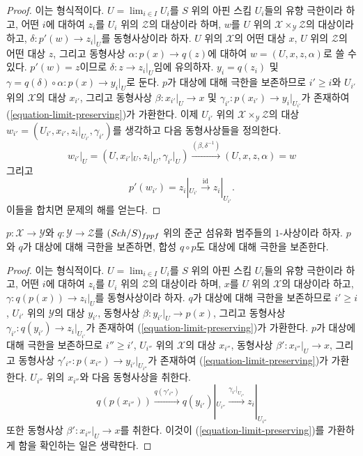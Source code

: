 \begin{proof}
이는 형식적이다. $U = \lim_{i \in I} U_i$를 $S$ 위의 아핀 스킴
$U_i$들의 유향 극한이라 하고, 어떤 $i$에 대하여 $z_i$를
$U_i$ 위의 $\mathcal{Z}$의 대상이라 하며, $w$를 $U$ 위의
$\mathcal{X} \times_\mathcal{Y} \mathcal{Z}$의 대상이라 하고,
$\delta : p'(w) \to z_i|_U$를 동형사상이라 하자.
$U$ 위의 $\mathcal{X}$의 어떤 대상 $x$, $U$ 위의 $\mathcal{Z}$의
어떤 대상 $z$, 그리고 동형사상 $\alpha : p(x) \to q(z)$에 대하여
$w = (U, x, z, \alpha)$로 쓸 수 있다. $p'(w) = z$이므로
$\delta : z \to z_i|_U$임에 유의하자. $y_i = q(z_i)$ 및
$\gamma = q(\delta) \circ \alpha : p(x) \to y_i|_U$로 둔다.
$p$가 대상에 대해 극한을 보존하므로 $i' \geq i$와
$U_{i'}$ 위의 $\mathcal{X}$의 대상 $x_{i'}$, 그리고 동형사상
$\beta : x_{i'}|_U \to x$ 및
$\gamma_{i'} : p(x_{i'}) \to y_i|_{U_{i'}}$가 존재하여
(\ref{equation-limit-preserving})가 가환한다. 이제
$U_{i'}$ 위의 $\mathcal{X} \times_\mathcal{Y} \mathcal{Z}$의 대상
$w_{i'} = (U_{i'}, x_{i'}, z_i|_{U_{i'}}, \gamma_{i'})$를 생각하고
다음 동형사상들을 정의한다.
$$
w_{i'}|_U = (U, x_{i'}|_U, z_i|_U, \gamma_{i'}|_U)
\xrightarrow{(\beta, \delta^{-1})}
(U, x, z, \alpha) = w
$$
그리고
$$
p'(w_{i'}) = z_i|_{U_{i'}} \xrightarrow{\text{id}} z_i|_{U_{i'}}.
$$
이들을 합치면 문제의 해를 얻는다.
\end{proof}

\begin{lemma}
\label{lemma-composition-limit-preserving}
$p : \mathcal{X} \to \mathcal{Y}$와 $q : \mathcal{Y} \to \mathcal{Z}$를
$(\mathit{Sch}/S)_{fppf}$ 위의 준군 섬유화 범주들의 $1$-사상이라 하자.
$p$와 $q$가 대상에 대해 극한을 보존하면, 합성
$q \circ p$도 대상에 대해 극한을 보존한다.
\end{lemma}

\begin{proof}
이는 형식적이다. $U = \lim_{i \in I} U_i$를 $S$ 위의 아핀 스킴
$U_i$들의 유향 극한이라 하고, 어떤 $i$에 대하여 $z_i$를
$U_i$ 위의 $\mathcal{Z}$의 대상이라 하며, $x$를
$U$ 위의 $\mathcal{X}$의 대상이라 하고,
$\gamma : q(p(x)) \to z_i|_U$를 동형사상이라 하자.
$q$가 대상에 대해 극한을 보존하므로 $i' \geq i$,
$U_{i'}$ 위의 $\mathcal{Y}$의 대상 $y_{i'}$, 동형사상
$\beta : y_{i'}|_U \to p(x)$, 그리고 동형사상
$\gamma_{i'} : q(y_{i'}) \to z_i|_{U_{i'}}$가 존재하여
(\ref{equation-limit-preserving})가 가환한다. $p$가 대상에 대해
극한을 보존하므로 $i'' \geq i'$, $U_{i''}$ 위의
$\mathcal{X}$의 대상 $x_{i''}$, 동형사상
$\beta' : x_{i''}|_U \to x$, 그리고 동형사상
$\gamma'_{i''} : p(x_{i''}) \to y_{i'}|_{U_{i''}}$가 존재하여
(\ref{equation-limit-preserving})가 가환한다.
$U_{i''}$ 위의 $x_{i''}$와 다음 동형사상을 취한다.
$$
q(p(x_{i''})) \xrightarrow{q(\gamma'_{i''})}
q(y_{i'})|_{U_{i''}} \xrightarrow{\gamma_{i'}|_{U_{i''}}}
z_i|_{U_{i''}}
$$
또한 동형사상 $\beta' : x_{i''}|_U \to x$를 취한다. 이것이
(\ref{equation-limit-preserving})를 가환하게 함을 확인하는 일은 생략한다.
\end{proof}

